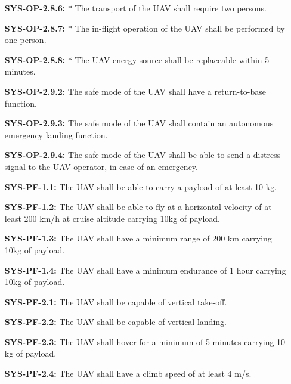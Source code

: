 \begin{enumerate}[leftmargin =4.5cm, align=parleft, labelwidth=10em]
    \item[\textbf{SYS-OP-2.8.6:} $\ast$ ] The transport of the UAV shall require two persons.
    \item[\textbf{SYS-OP-2.8.7:} $\ast$ ] The in-flight operation of the UAV shall be performed by one person.
    \item[\textbf{SYS-OP-2.8.8:} $\ast$ ] The UAV energy source shall be replaceable within 5 minutes.
    \item[\textbf{SYS-OP-2.9.2:}] The safe mode of the UAV shall have a return-to-base function.
    \item[\textbf{SYS-OP-2.9.3:}] The safe mode of the UAV shall contain an autonomous emergency landing function.
    \item[\textbf{SYS-OP-2.9.4:}] The safe mode of the UAV shall be able to send a distress signal to the UAV operator, in case of an emergency.
    \item[\textbf{SYS-PF-1.1:} \ddag] The UAV shall be able to carry a payload of at least 10 kg.
	\item[\textbf{SYS-PF-1.2:} \ddag] The UAV shall be able to fly at a horizontal velocity of at least 200 km/h at cruise altitude carrying 10kg of payload.
	\item[\textbf{SYS-PF-1.3:} \dag] The UAV shall have a minimum range of 200 km carrying 10kg of payload.
	\item[\textbf{SYS-PF-1.4:}] The UAV shall have a minimum endurance of 1 hour carrying 10kg of payload.
	\item[\textbf{SYS-PF-2.1:} \dag \ddag] The UAV shall be capable of vertical take-off.
	\item[\textbf{SYS-PF-2.2:} \dag \ddag] The UAV shall be capable of vertical landing.
	\item[\textbf{SYS-PF-2.3:}] The UAV shall hover for a minimum of 5 minutes carrying 10 kg of payload.
	\item[\textbf{SYS-PF-2.4:}] The UAV shall have a climb speed of at least 4 m/s.

\end{enumerate}
